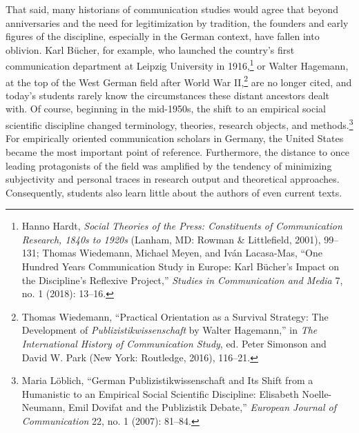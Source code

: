 \documentclass{tufte-handout}
\begin{document}
That said, many historians of communication studies would agree that
beyond anniversaries and the need for legitimization by tradition, the
founders and early figures of the discipline, especially in the German
context, have fallen into oblivion. Karl Bücher, for example, who
launched the country's first communication department at Leipzig
University in 1916,\footnote{Hanno Hardt, \emph{Social Theories of the Press: Constituents of
  Communication Research, 1840s to 1920s} (Lanham, MD: Rowman \&
  Littlefield, 2001), 99--131; Thomas Wiedemann, Michael Meyen, and Iván
  Lacasa-Mas, ``One Hundred Years Communication Study in Europe: Karl
  Bücher's Impact on the Discipline's Reflexive Project,'' \emph{Studies
  in Communication and Media} 7, no. 1 (2018): 13--16.
} or Walter
Hagemann, at the top of the West German field after World War
II,\footnote{Thomas Wiedemann, ``Practical Orientation as a Survival Strategy: The
  Development of \emph{Publizistikwissenschaft} by Walter Hagemann,'' in
  \emph{The International History of Communication Study}, ed. Peter
  Simonson and David W. Park (New York: Routledge, 2016), 116--21.
} are no longer cited, and
today's students rarely know the circumstances these distant ancestors
dealt with. Of course, beginning in the mid-1950s, the shift to an
empirical social scientific discipline changed terminology, theories,
research objects, and methods.\footnote{Maria Löblich, ``German Publizistikwissenschaft and Its Shift from a
  Humanistic to an Empirical Social Scientific Discipline: Elisabeth
  Noelle-Neumann, Emil Dovifat and the Publizistik Debate,''
  \emph{European Journal of Communication} 22, no. 1 (2007): 81--84.
} For
empirically oriented communication scholars in Germany, the United
States became the most important point of reference. Furthermore, the
distance to once leading protagonists of the field was amplified by the
tendency of minimizing subjectivity and personal traces in research
output and theoretical approaches. Consequently, students also learn
little about the authors of even current texts.
\end{document}
